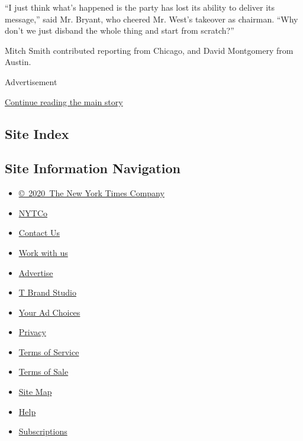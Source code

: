 ``I just think what's happened is the party has lost its ability to
deliver its message,'' said Mr. Bryant, who cheered Mr. West's takeover
as chairman. ``Why don't we just disband the whole thing and start from
scratch?''

Mitch Smith contributed reporting from Chicago, and David Montgomery
from Austin.

Advertisement

\protect\hyperlink{after-bottom}{Continue reading the main story}

\hypertarget{site-index}{%
\subsection{Site Index}\label{site-index}}

\hypertarget{site-information-navigation}{%
\subsection{Site Information
Navigation}\label{site-information-navigation}}

\begin{itemize}
\tightlist
\item
  \href{https://help.nytimes.com/hc/en-us/articles/115014792127-Copyright-notice}{©~2020~The
  New York Times Company}
\end{itemize}

\begin{itemize}
\tightlist
\item
  \href{https://www.nytco.com/}{NYTCo}
\item
  \href{https://help.nytimes.com/hc/en-us/articles/115015385887-Contact-Us}{Contact
  Us}
\item
  \href{https://www.nytco.com/careers/}{Work with us}
\item
  \href{https://nytmediakit.com/}{Advertise}
\item
  \href{http://www.tbrandstudio.com/}{T Brand Studio}
\item
  \href{https://www.nytimes.com/privacy/cookie-policy\#how-do-i-manage-trackers}{Your
  Ad Choices}
\item
  \href{https://www.nytimes.com/privacy}{Privacy}
\item
  \href{https://help.nytimes.com/hc/en-us/articles/115014893428-Terms-of-service}{Terms
  of Service}
\item
  \href{https://help.nytimes.com/hc/en-us/articles/115014893968-Terms-of-sale}{Terms
  of Sale}
\item
  \href{https://spiderbites.nytimes.com}{Site Map}
\item
  \href{https://help.nytimes.com/hc/en-us}{Help}
\item
  \href{https://www.nytimes.com/subscription?campaignId=37WXW}{Subscriptions}
\end{itemize}
